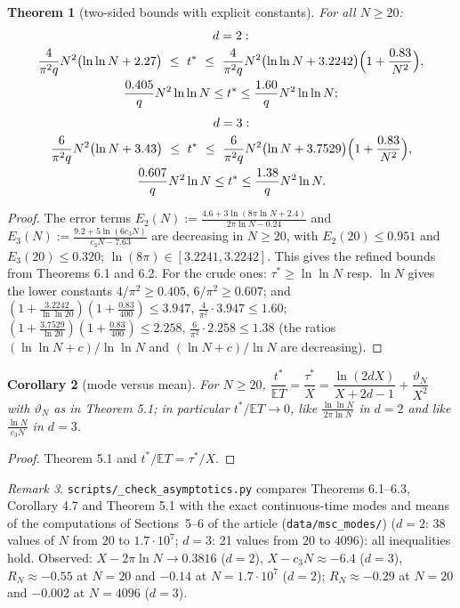 \documentclass[11pt,a4paper]{article}
\newtheorem{theorem}{Theorem}[section]
\newtheorem{corollary}[theorem]{Corollary}
\theoremstyle{definition}
\theoremstyle{remark}
\newtheorem{remark}[theorem]{Remark}
\begin{document}
\begin{theorem}[{two-sided bounds with explicit constants}]
For all $N\ge20$:
\begin{gather*}
d=2: \\
\frac{4}{\pi^2q}N^2\bigl(\ln\ln N+2.27\bigr)\ \le\ t^*\ \le\ \frac{4}{\pi^2q}N^2\bigl(\ln\ln N+3.2242\bigr)\Bigl(1+\frac{0.83}{N^2}\Bigr), \\
\frac{0.405}{q}N^2\ln\ln N\le t^*\le\frac{1.60}{q}N^2\ln\ln N;
\end{gather*}
\begin{gather*}
d=3: \\
\frac{6}{\pi^2q}N^2\bigl(\ln N+3.43\bigr)\ \le\ t^*\ \le\ \frac{6}{\pi^2q}N^2\bigl(\ln N+3.7529\bigr)\Bigl(1+\frac{0.83}{N^2}\Bigr), \\
\frac{0.607}{q}N^2\ln N\le t^*\le\frac{1.38}{q}N^2\ln N .
\end{gather*}
\end{theorem}

\begin{proof}
The error terms $E_2(N):=\frac{4.6+3\ln(8\pi\ln N+2.4)}{2\pi\ln N-0.24}$ and $E_3(N):=\frac{9.2+5\ln(6c_3N)}{c_3N-7.63}$ are decreasing in $N\ge20$, with $E_2(20)\le0.951$ and $E_3(20)\le0.320$; $\ln(8\pi)\in[3.2241,3.2242]$. This gives the refined bounds from Theorems 6.1 and 6.2. For the crude ones: $\tau^*\ge\ln\ln N$ resp. $\ln N$ gives the lower constants $4/\pi^2\ge0.405$, $6/\pi^2\ge0.607$; and $(1+\frac{3.2242}{\ln\ln 20})(1+\frac{0.83}{400})\le3.947$, $\frac{4}{\pi^2}\cdot3.947\le1.60$; $(1+\frac{3.7529}{\ln20})(1+\frac{0.83}{400})\le2.258$, $\frac6{\pi^2}\cdot2.258\le1.38$ (the ratios $(\ln\ln N+c)/\ln\ln N$ and $(\ln N+c)/\ln N$ are decreasing).
\end{proof}

\begin{corollary}[{mode versus mean}]
For $N\ge20$, $\dfrac{t^*}{\mathbb ET}=\dfrac{\tau^*}{X}=\dfrac{\ln(2dX)}{X+2d-1}+\dfrac{\vartheta_N}{X^2}$ with $\vartheta_N$ as in Theorem 5.1; in particular $t^*/\mathbb ET\to0$, like $\frac{\ln\ln N}{2\pi\ln N}$ in $d=2$ and like $\frac{\ln N}{c_3N}$ in $d=3$.
\end{corollary}

\begin{proof}
Theorem 5.1 and $t^*/\mathbb ET=\tau^*/X$.
\end{proof}

\begin{remark}
\texttt{scripts/\_\allowbreak check\_\allowbreak asymptotics.py} compares Theorems 6.1–6.3, Corollary 4.7 and Theorem 5.1 with the exact continuous-time modes and means of the computations of Sections~5--6 of the article (\texttt{data/msc\_modes/}) ($d=2$: 38 values of $N$ from $20$ to $1.7\cdot10^7$; $d=3$: 21 values from $20$ to $4096$): all inequalities hold. Observed: $X-2\pi\ln N\to0.3816$ ($d=2$), $X-c_3N\approx-6.4$ ($d=3$), $R_N\approx-0.55$ at $N=20$ and $-0.14$ at $N=1.7\cdot10^7$ ($d=2$); $R_N\approx-0.29$ at $N=20$ and $-0.002$ at $N=4096$ ($d=3$).
\end{remark}
\end{document}
